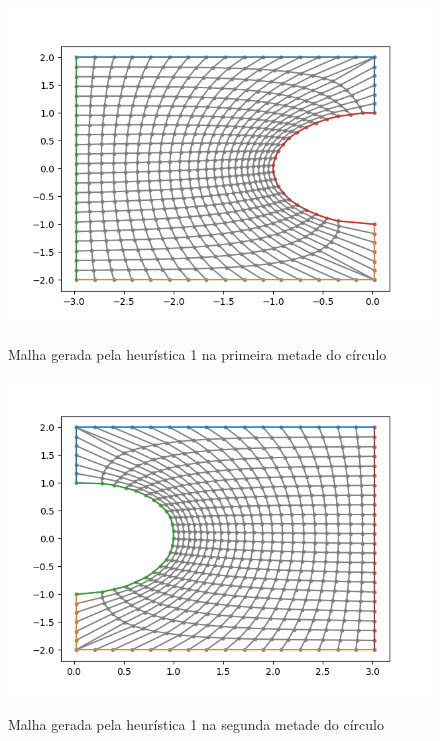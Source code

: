 \documentclass[a4paper]{article}
\begin{document}
 \begin{figure}[h]
 	\centering
 	\includegraphics[width=1.0\textwidth]{heuristica_1_50pts_top1.png}
 	\label{fig:heuristic1_top1} 
 	\caption[caption]{Malha gerada pela heurística 1 na primeira metade do círculo}
 \end{figure}


 \begin{figure}[h]
	\centering
	\includegraphics[width=1.0\textwidth]{heuristica_1_50pts_top2.png}
	\label{fig:heuristic1_top2} 
	\caption[caption]{Malha gerada pela heurística 1 na segunda metade do círculo}
\end{figure}


\end{document}
